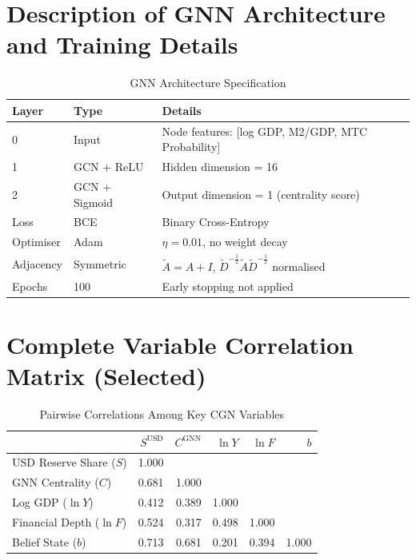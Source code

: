 \documentclass[12pt, letterpaper]{article}
\theoremstyle{definition}
\begin{document}
\section{Description of GNN Architecture and Training Details}

\begin{table}[H]
\centering
\caption{GNN Architecture Specification}
\begin{tabular}{lll}
\toprule
\textbf{Layer} & \textbf{Type} & \textbf{Details} \\
\midrule
0 & Input & Node features: [log GDP, M2/GDP, MTC Probability] \\
1 & GCN + ReLU & Hidden dimension = 16 \\
2 & GCN + Sigmoid & Output dimension = 1 (centrality score) \\
\midrule
Loss & BCE & Binary Cross-Entropy \\
Optimiser & Adam & $\eta = 0.01$, no weight decay \\
Adjacency & Symmetric & $\tilde{A} = A + I$, $\tilde{D}^{-\frac{1}{2}}\tilde{A}\tilde{D}^{-\frac{1}{2}}$ normalised \\
Epochs & 100 & Early stopping not applied \\
\bottomrule
\end{tabular}
\end{table}

\section{Complete Variable Correlation Matrix (Selected)}

\begin{table}[H]
\centering
\caption{Pairwise Correlations Among Key CGN Variables}
\begin{tabular}{lrrrrr}
\toprule
 & $S^{\text{USD}}$ & $C^{\text{GNN}}$ & $\ln Y$ & $\ln F$ & $b$ \\
\midrule
USD Reserve Share ($S$) & 1.000 & & & & \\
GNN Centrality ($C$) & 0.681 & 1.000 & & & \\
Log GDP ($\ln Y$) & 0.412 & 0.389 & 1.000 & & \\
Financial Depth ($\ln F$) & 0.524 & 0.317 & 0.498 & 1.000 & \\
Belief State ($b$) & 0.713 & 0.681 & 0.201 & 0.394 & 1.000 \\
\bottomrule
\end{tabular}
\end{table}
\end{document}
